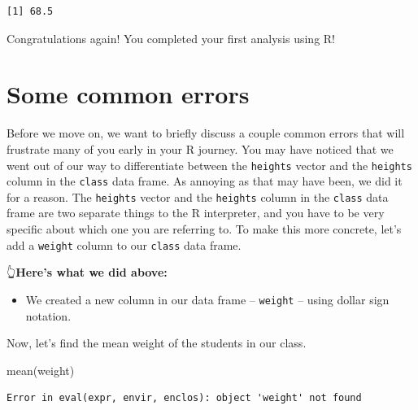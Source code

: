 \documentclass[
  letterpaper,
  DIV=11,
  numbers=noendperiod]{scrreprt}
\newenvironment{Shaded}{\begin{snugshade}}{\end{snugshade}}
\newcommand{\DecValTok}[1]{\textcolor[rgb]{0.68,0.00,0.00}{#1}}
\newcommand{\FunctionTok}[1]{\textcolor[rgb]{0.28,0.35,0.67}{#1}}
\newcommand{\NormalTok}[1]{\textcolor[rgb]{0.00,0.23,0.31}{#1}}
\newcommand{\OtherTok}[1]{\textcolor[rgb]{0.00,0.23,0.31}{#1}}
\newcommand{\SpecialCharTok}[1]{\textcolor[rgb]{0.37,0.37,0.37}{#1}}
\providecommand{\tightlist}{%
  \setlength{\itemsep}{0pt}\setlength{\parskip}{0pt}}\usepackage{longtable,booktabs,array}
\begin{document}
\begin{verbatim}
[1] 68.5
\end{verbatim}

Congratulations again! You completed your first analysis using R!

\section{Some common errors}\label{some-common-errors}

Before we move on, we want to briefly discuss a couple common errors
that will frustrate many of you early in your R journey. You may have
noticed that we went out of our way to differentiate between the
\texttt{heights} vector and the \texttt{heights} column in the
\texttt{class} data frame. As annoying as that may have been, we did it
for a reason. The \texttt{heights} vector and the \texttt{heights}
column in the \texttt{class} data frame are two separate things to the R
interpreter, and you have to be very specific about which one you are
referring to. To make this more concrete, let's add a \texttt{weight}
column to our \texttt{class} data frame.

\begin{Shaded}
\end{Shaded}

👆\textbf{Here's what we did above:}

\begin{itemize}
\tightlist
\item
  We created a new column in our data frame -- \texttt{weight} -- using
  dollar sign notation.
\end{itemize}

Now, let's find the mean weight of the students in our class.

\begin{Shaded}
\begin{Highlighting}[]
\FunctionTok{mean}\NormalTok{(weight)}
\end{Highlighting}
\end{Shaded}

\begin{verbatim}
Error in eval(expr, envir, enclos): object 'weight' not found
\end{verbatim}
\end{document}
